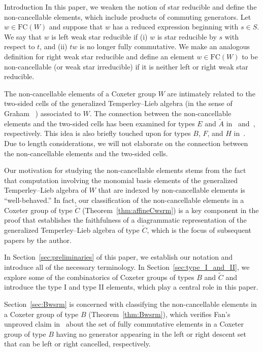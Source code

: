 \documentclass[12pt]{amsart}
\newcommand{\C}{\widetilde{C}}
\renewcommand{\(}{\left(}
\renewcommand{\)}{\right)}
\newcommand{\FC}{\mathrm{FC}}
\begin{document}
\begin{section}{Introduction}
In this paper, we weaken the notion of star reducible and define the non-cancellable elements, which include products of commuting generators.  Let $w \in \FC(W)$ and suppose that $w$ has a reduced expression beginning with $s\in S$.  We say that $w$ is left weak star reducible if (i) $w$ is star reducible by $s$ with respect to $t$,  and (ii) $tw$ is no longer fully commutative.  We make an analogous definition for right weak star reducible and define an element $w \in \FC(W)$ to be non-cancellable (or weak star irreducible) if it is neither left or right weak star reducible.

The non-cancellable elements of a Coxeter group $W$ are intimately related to the two-sided cells of the generalized Temperley--Lieb algebra (in the sense of Graham ~\cite{Graham.J:A}) associated to $W$.  The connection between the non-cancellable elements and the two-sided cells has been examined for types $E$ and $\widetilde{A}$ in~\cite{Fan.C:A} and~\cite{Fan.C;Green.R:A}, respectively.  This idea is also briefly touched upon for types $B$, $F$, and $H$ in~\cite{Fan.C:A}.  Due to length considerations, we will not elaborate on the connection between the non-cancellable elements and the two-sided cells.

Our motivation for studying the non-cancellable elements stems from the fact that computation involving the monomial basis elements of the generalized Tem\-per\-ley--Lieb algebra of $W$ that are indexed by non-cancellable elements is ``well-behaved.''  In fact, our classification of the non-cancellable elements in a Coxeter group of type $\C$ (Theorem~\ref{thm:affineCwsrm}) is a key component in the proof that establishes the faithfulness of a diagrammatic representation of the generalized Temperley--Lieb algebra of type $\C$, which is the focus of subsequent papers by the author.

In Section~\ref{sec:preliminaries} of this paper, we establish our notation and introduce all of the necessary terminology.  In Section~\ref{sec:type_I_and_II}, we explore some of the combinatorics of Coxeter groups of types $B$ and $\C$ and introduce the type I and type II elements, which play a central role in this paper. 

Section~\ref{sec:Bwsrm} is concerned with classifying the non-cancellable elements in a Coxeter group of type $B$ (Theorem~\ref{thm:Bwsrm}), which verifies Fan's unproved claim in~\cite[]{Fan.C:A} about the set of fully commutative elements in a Coxeter group of type $B$ having no generator appearing in the left or right descent set that can be left or right cancelled, respectively.


\end{section}
\end{document}

